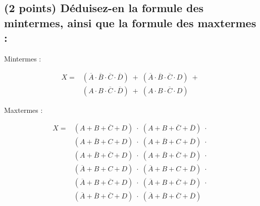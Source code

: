 \documentclass[11pt,a4paper]{article}
\begin{document}
\begin{table}[!ht]
\begin{minipage}{0.50\textwidth}
\subsection{(2 points) Déduisez-en la formule des mintermes, ainsi que la formule des maxtermes : }

\bigskip

Mintermes :


\begin{equation*}
    \begin{split}
X = & ( \overline{A} \cdot \overline{B} \cdot \overline{C} \cdot \overline{D} ) \; + \; ( \overline{A} \cdot \overline{B} \cdot \overline{C} \cdot D ) \; + \; \\
    & ( A \cdot B \cdot \overline{C} \cdot \overline{D} ) \; + \; ( A \cdot B \cdot \overline{C} \cdot D )
    \end{split}
\end{equation*}

\bigskip

Maxtermes :


\begin{equation*}
    \begin{split}
X = & ( A + B + \overline{C} + D ) \; \cdot \; ( A + B + \overline{C} + \overline{D} ) \; \cdot \; \\
    & ( A + \overline{B} + C + D ) \; \cdot \; ( A + \overline{B} + C + \overline{D} ) \; \cdot \; \\
    & ( A + \overline{B} + \overline{C} + D ) \; \cdot \; ( A + \overline{B} + \overline{C} + \overline{D} ) \; \cdot \; \\
    & ( \overline{A} + B + C + D ) \; \cdot \; ( \overline{A} + B + C + \overline{D} ) \; \cdot \; \\
    & ( \overline{A} + B + \overline{C} + D ) \; \cdot \; ( \overline{A} + B + \overline{C} + \overline{D} ) \; \cdot \; \\
    & ( \overline{A} + \overline{B} + \overline{C} + D ) \; \cdot \; ( \overline{A} + \overline{B} + \overline{C} + \overline{D} )
    \end{split}
\end{equation*}

  \end{minipage}
\end{table}
\end{document}
